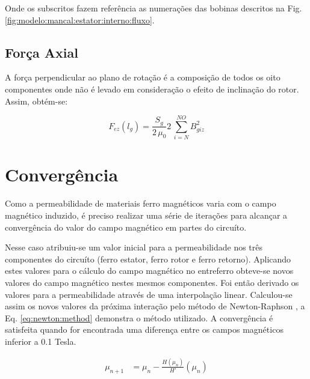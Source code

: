 Onde os subscritos fazem referência as numerações das bobinas descritos na Fig. \ref{fig:modelo:mancal:estator:interno:fluxo}.

\subsection{Força Axial}

A força perpendicular ao plano de rotação é a composição de todos os oito componentes onde não é levado em consideração o efeito de inclinação do rotor. Assim, obtém-se:

\begin{equation}
F_{ez}(l_g) = \frac{S_{g}}{2 \, \mu_0} 	2 \,\sum_{i=N}^{NO} B_{giz}^2
\end{equation}

\section{Convergência}

Como a permeabilidade de materiais ferro magnéticos varia com o campo magnético induzido, é preciso realizar uma série de iterações para alcançar a convergência do valor do campo magnético em partes do circuíto. 

Nesse caso atribuiu-se um valor inicial para a permeabilidade nos três componentes do circuíto (ferro estator, ferro rotor e ferro retorno). Aplicando estes valores para o cálculo do campo magnético no entreferro obteve-se novos valores do campo magnético nestes mesmos componentes. Foi então derivado os valores para a permeabilidade através de uma interpolação linear. Calculou-se assim os novos valores da próxima interação pelo método de  Newton-Raphson \citep{Ortner2010}, a Eq. \ref{eq:newton:method} demonstra o método utilizado. A convergência é satisfeita quando for encontrada uma diferença entre os campos magnéticos inferior a 0.1 Tesla. 

\begin{align}
	\mu_{n+1} &= \mu_n - \frac{H(\mu_n)}{H'}(\mu_n)
	\label{eq:newton:method}
\end{align} 



%

